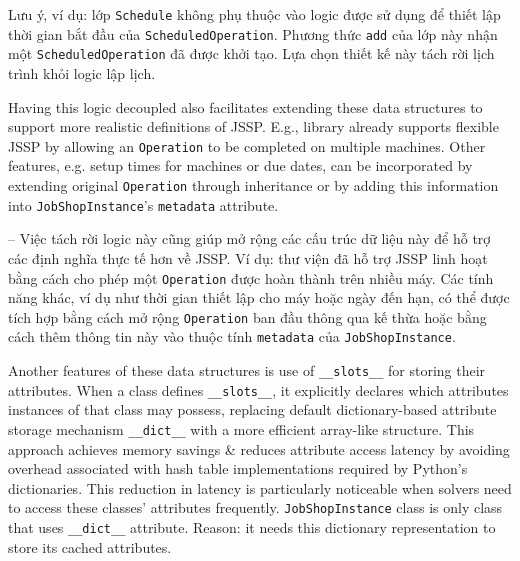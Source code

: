 \documentclass{article}
\begin{document}
\begin{itemize}
\begin{itemize}
\begin{enumerate}
        \end{enumerate}
        Lưu ý, ví dụ: lớp {\tt Schedule} không phụ thuộc vào logic được sử dụng để thiết lập thời gian bắt đầu của {\tt ScheduledOperation}. Phương thức {\tt add} của lớp này nhận một {\tt ScheduledOperation} đã được khởi tạo. Lựa chọn thiết kế này tách rời lịch trình khỏi logic lập lịch.

        Having this logic decoupled also facilitates extending these data structures to support more realistic definitions of JSSP. E.g., library already supports flexible JSSP by allowing an {\tt Operation} to be completed on multiple machines. Other features, e.g. setup times for machines or due dates, can be incorporated by extending original {\tt Operation} through inheritance or by adding this information into {\tt JobShopInstance}'s {\tt metadata} attribute.

        -- Việc tách rời logic này cũng giúp mở rộng các cấu trúc dữ liệu này để hỗ trợ các định nghĩa thực tế hơn về JSSP. Ví dụ: thư viện đã hỗ trợ JSSP linh hoạt bằng cách cho phép một {\tt Operation} được hoàn thành trên nhiều máy. Các tính năng khác, ví dụ như thời gian thiết lập cho máy hoặc ngày đến hạn, có thể được tích hợp bằng cách mở rộng {\tt Operation} ban đầu thông qua kế thừa hoặc bằng cách thêm thông tin này vào thuộc tính {\tt metadata} của {\tt JobShopInstance}.

        Another features of these data structures is use of \verb|__slots__| for storing their attributes. When a class defines \verb|__slots__|, it explicitly declares which attributes instances of that class may possess, replacing default dictionary-based attribute storage mechanism \verb|__dict__| with a more efficient array-like structure. This approach achieves memory savings \& reduces attribute access latency by avoiding overhead associated with hash table implementations required by Python's dictionaries. This reduction in latency is particularly noticeable when solvers need to access these classes' attributes frequently. {\tt JobShopInstance} class is only class that uses \verb|__dict__| attribute. Reason: it needs this dictionary representation to store its cached attributes.


\end{itemize}
\end{itemize}
\end{document}
